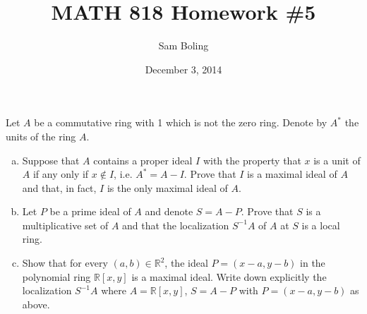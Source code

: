 \documentclass{article}
\title{MATH 818 Homework \#5}
\date{December 3, 2014}
\author{Sam Boling}
\newcounter{Problem}
\newenvironment{Problem}{\begin{Exercise}[name={Problem},
                                          counter={Problem}]}
                        {\end{Exercise}}
\begin{document}
\begin{titlepage}
\maketitle
\end{titlepage}

\begin{Problem}
  Let $A$ be a commutative ring with 1 which is not the zero
  ring. Denote by $A^\ast$ the units of the ring $A$.
  \begin{enumerate}[(a)]
    \item{
      Suppose that $A$ contains a proper ideal $I$ with the property
      that $x$ is a unit of $A$ if any only if $x \notin I$, i.e.
      $A^\ast = A - I$. Prove that $I$ is a maximal ideal of $A$ and
      that, in fact, $I$ is the only maximal ideal of $A$.
    }
    \item{
      Let $P$ be a prime ideal of $A$ and denote $S = A - P$. Prove
      that $S$ is a multiplicative set of $A$ and that the
      localization $S^{-1}A$ of $A$ at $S$ is a local ring.
    }
    \item{
      Show that for every $(a, b) \in \mathbb{R}^2$, the ideal
      $P = (x - a, y - b)$ in the polynomial ring
      $\mathbb{R}[x, y]$ is a maximal ideal. Write down explicitly the
      localization $S^{-1} A$ where $A = \mathbb{R}[x, y]$,
      $S = A - P$ with $P = (x - a, y - b)$ as above.
    }
  \end{enumerate}
\end{Problem}
\end{document}
